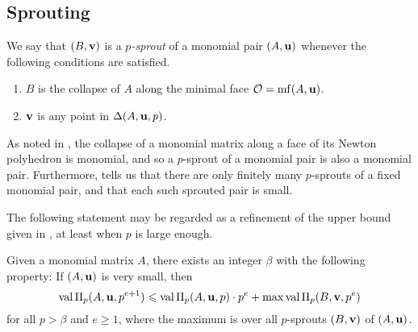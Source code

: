 \documentclass[11pt]{amsart}
\begin{document}

\subsection{Sprouting}

\begin{definition}
\label{p-sprout: D}
We say that $(B, \mathbf{v})$ is a \emph{$p$-sprout} of a monomial pair $(A, \mathbf{u})$ whenever the following conditions are satisfied.
\begin{enumerate}
\item $B$ is the collapse of $A$ along the minimal face $\mathcal{O} = \operatorname{mf}(A, \mathbf{u})$.
\item $\mathbf{v}$ is any point in $\Delta(A, \mathbf{u}, p)$.
\end{enumerate}
\end{definition}



\begin{remark}
\label{p-sprout: R} 
As noted in , the collapse of a monomial matrix along a face of its Newton polyhedron is monomial, and so a $p$-sprout of a monomial pair is also a monomial pair.  Furthermore,    tells us that there are only finitely many $p$-sprouts of a fixed monomial pair, and that each such sprouted pair is small. 
 \end{remark}

The following statement may be regarded as a refinement of the upper bound given in , at least when $p$ is large enough.


\begin{corollary}\label{cor: upper bound for higher mus}
Given a monomial matrix $A$, there exists an integer $\beta$ with the following property\textup:  If $(A, \mathbf{u})$ is very small, then
%
\[ \operatorname{val} \Pi_p(A, \mathbf{u}, p^{e+1})  \leqslant  \operatorname{val} \Pi_p(A, \mathbf{u}, p) \cdot p^e +  \max \operatorname{val} \Pi_p(B, \mathbf{v}, p^e) \] 
%
for all $p > \beta$ and $e \geq 1$, where the maximum is over all $p$-sprouts $(B, \mathbf{v})$ of $(A, \mathbf{u})$.  
\end{corollary}
\end{document}
